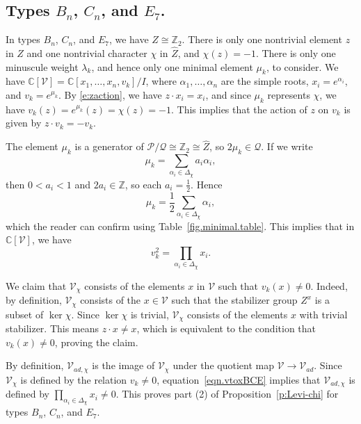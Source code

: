\documentclass[reqno,11pt]{amsart}
\theoremstyle{remark}
\theoremstyle{remark}
\theoremstyle{definition}
\theoremstyle{definition}
\theoremstyle{definition}
\numberwithin{equation}{section}
\newcommand{\C}{\mathbb{C}}           %
\newcommand{\Z}{\mathbb{ Z}}           %
\renewcommand{\ker}{\operatorname{ker }}
\newcommand{\ga}{\alpha}
\newcommand{\cp}{\mathcal{P}}
\newcommand{\cq}{\mathcal{Q}}
\newcommand{\toric}{\mathcal{V}}
\renewcommand{\hat}{\widehat}
\begin{document}
\subsection{Types $B_n$, $C_n$, and $E_7$.}
In types $B_n$, $C_n$, and $E_7$, we have $Z \cong \Z_2$.
There is only one nontrivial element $z$ in $Z$ and one nontrivial character
$\chi$ in $\hat{Z}$, and $\chi(z) = -1$.  There is only one minuscule weight $\lambda_k$, and hence only one minimal element $\mu_k$, to consider. We have $\C[\toric] = \C[x_1, \ldots, x_n, v_k]/I$, where $\ga_1, \ldots, \ga_n$ are the simple roots, $x_i = e^{\alpha_i}$, and $v_k = e^{\mu_k}$.  By \eqref{e:zaction}, we have $z \cdot x_i = x_i$, and since
$\mu_k$ represents $\chi$, we have $v_k (z) = e^{\mu_k}(z) = \chi(z) = -1$.  This implies that the 
action of $z$ on $v_k$ is given by $z \cdot v_k = - v_k$.

The element $\mu_k$ is a generator of $\cp/\cq \cong \Z_2\cong \hat{Z}$, so $2 \mu_k \in \cq$.  If we write 
$$
\mu_k = \sum_{\alpha_i  \in \Delta_{\chi}}  a_i \ga_i,
$$
then $0 < a_i < 1$ and $2 a_i \in \Z$, so each $a_i = \frac{1}{2}$.  Hence
$$
\mu_k = \frac{1}{2} \sum_{\ga_i \in \Delta_{\chi}} \ga_i,
$$
which the reader can confirm using Table~\ref{fig.minimal.table}. This implies 
that in $\C[\toric]$, we have 
\begin{equation} \label{eqn.vtoxBCE}
v_k^2 = \prod_{ \alpha_i \in \Delta_{\chi}} x_i.
\end{equation}

We claim that $\toric_{\chi}$ consists of the elements $x$ in $\toric$ such that $v_k(x) \neq 0$.  Indeed, by
definition, $\toric_{\chi}$ consists of the $x\in \toric$
such that the stabilizer group $Z^x$ is a subset of $\ker \chi$.  
Since $\ker \chi$ is trivial, $\toric_{\chi}$ consists of the elements $x$ with trivial stabilizer.  This means $z \cdot x \neq x$, which is equivalent to the condition that $v_k(x) \neq 0$, proving the claim.

By definition,  $\toric_{ad, \chi}$ is the image of $\toric_{\chi}$ under the quotient map $\toric \to \toric_{ad}$.
Since $\toric_{\chi}$ is defined by the relation $v_k \neq 0$, equation~\eqref{eqn.vtoxBCE} implies that $\toric_{ad, \chi}$ is defined by $\prod_{ \alpha_i \in \Delta_{\chi}} x_i \neq 0$.    This proves part (2) of Proposition~\ref{p:Levi-chi} for types $B_n$, $C_n$, and $E_7$.


\end{document}
